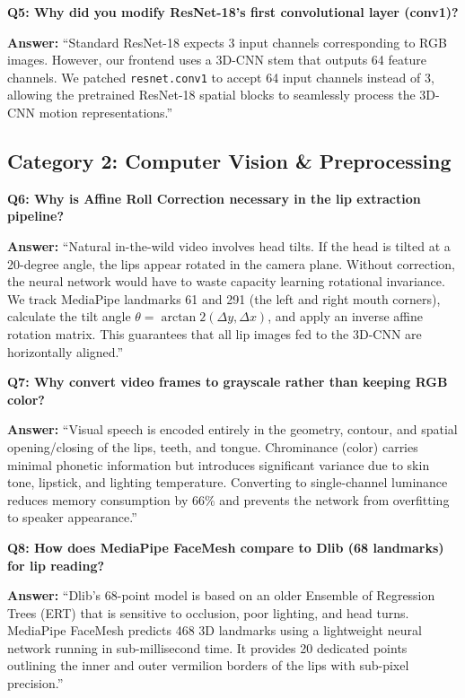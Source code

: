 \documentclass[11pt,a4paper]{article}
\begin{document}
\textbf{Q5: Why did you modify ResNet-18's first convolutional layer (conv1)?}
\begin{tcolorbox}[colback=gray!5!white,colframe=gray!75!black]
\textbf{Answer:} ``Standard ResNet-18 expects 3 input channels corresponding to RGB images. However, our frontend uses a 3D-CNN stem that outputs 64 feature channels. We patched \texttt{resnet.conv1} to accept 64 input channels instead of 3, allowing the pretrained ResNet-18 spatial blocks to seamlessly process the 3D-CNN motion representations.''
\end{tcolorbox}

\subsection{Category 2: Computer Vision \& Preprocessing}

\textbf{Q6: Why is Affine Roll Correction necessary in the lip extraction pipeline?}
\begin{tcolorbox}[colback=gray!5!white,colframe=gray!75!black]
\textbf{Answer:} ``Natural in-the-wild video involves head tilts. If the head is tilted at a 20-degree angle, the lips appear rotated in the camera plane. Without correction, the neural network would have to waste capacity learning rotational invariance. We track MediaPipe landmarks 61 and 291 (the left and right mouth corners), calculate the tilt angle $\theta = \arctan2(\Delta y, \Delta x)$, and apply an inverse affine rotation matrix. This guarantees that all lip images fed to the 3D-CNN are horizontally aligned.''
\end{tcolorbox}

\textbf{Q7: Why convert video frames to grayscale rather than keeping RGB color?}
\begin{tcolorbox}[colback=gray!5!white,colframe=gray!75!black]
\textbf{Answer:} ``Visual speech is encoded entirely in the geometry, contour, and spatial opening/closing of the lips, teeth, and tongue. Chrominance (color) carries minimal phonetic information but introduces significant variance due to skin tone, lipstick, and lighting temperature. Converting to single-channel luminance reduces memory consumption by 66\% and prevents the network from overfitting to speaker appearance.''
\end{tcolorbox}

\textbf{Q8: How does MediaPipe FaceMesh compare to Dlib (68 landmarks) for lip reading?}
\begin{tcolorbox}[colback=gray!5!white,colframe=gray!75!black]
\textbf{Answer:} ``Dlib's 68-point model is based on an older Ensemble of Regression Trees (ERT) that is sensitive to occlusion, poor lighting, and head turns. MediaPipe FaceMesh predicts 468 3D landmarks using a lightweight neural network running in sub-millisecond time. It provides 20 dedicated points outlining the inner and outer vermilion borders of the lips with sub-pixel precision.''
\end{tcolorbox}
\end{document}

